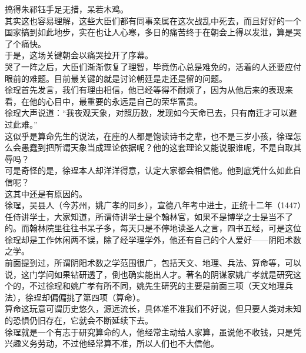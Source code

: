 \begin{multicols}{\theparacolNo}
搞得朱祁钰手足无措，呆若木鸡。\\

其实这也容易理解，这些大臣们都有同事亲属在这次战乱中死去，而且好好的一个国家搞到如此地步，实在也让人心寒，多日的痛苦终于在朝会上得以发泄，算是哭了个痛快。\\

于是，这场关键朝会以痛哭拉开了序幕。\\

哭了一阵之后，大臣们渐渐恢复了理智，毕竟伤心总是难免的，活着的人还要应付眼前的难题。目前最关键的就是讨论朝廷是走还是留的问题。\\

徐珵首先发言，我们有理由相信，他已经等得不耐烦了，因为从他后来的表现来看，在他的心目中，最重要的永远是自己的荣华富贵。\\

徐珵大声说道：“我夜观天象，对照历数，发现如今天命已去，只有南迁才可以避过此难。”\\

这似乎是算命先生的说法，在座的人都是饱读诗书之辈，也不是三岁小孩，徐珵怎么会愚蠢到把所谓天象当成理论依据呢？他的这套理论又能说服谁呢，不是自取其辱吗？\\

可是奇怪的是，徐珵本人却洋洋得意，认定大家都会相信他。他到底凭什么如此自信呢？\\

这其中还是有原因的。\\

徐珵，吴县人（今苏州，姚广孝的同乡），宣德八年考中进士，正统十二年（1447）任侍讲学士，大家知道，所谓侍讲学士是个翰林官，如果不是博学之士是当不了的。而翰林院里往往书呆子多，每天只是不停地读圣人之言，四书五经，可是这位徐珵却是工作休闲两不误，除了经学理学外，他还有自己的个人爱好——阴阳术数之学。\\

前面提到过，所谓阴阳术数之学范围很广，包括天文、地理、兵法、算命等，可以说，这门学问如果钻研透了，倒也确实能出人才。著名的阴谋家姚广孝就是研究这个的，不过徐珵和姚广孝有所不同，姚先生研究的主要是前面三项（天文地理兵法），徐珵却偏偏挑了第四项（算命）。\\

算命这玩意可谓历史悠久，源远流长，具体准不准我们不好说，但只要人类对未知的恐惧仍旧存在，它就会不断延续下去。\\

徐珵就是一个有志于研究算命的人，他经常主动给人家算，虽说他不收钱，只是凭兴趣义务劳动，不过他经常算不准，所以人们也不大信他。\\


\end{multicols}
